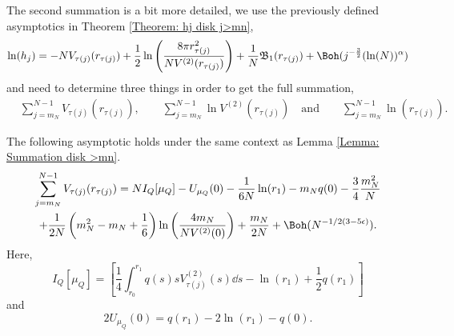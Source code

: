 The second summation is a bit more detailed, we use the previously defined asymptotics in Theorem \ref{Theorem: hj disk j>mn},
\begin{equation}
	\ln(h_j) = -N V_{\tau(j)} (r_{\tau(j)}) + \frac{1}{2} \ln{\left( \frac{8\pi r^2_{\tau(j)}}{N V^{(2)}(r_{\tau(j)})}  \right)} + \frac{1}{N} \mathfrak{B}_1(r_{\tau(j)}) + \Boh(j^{-\frac{3}{2}} (\ln(N))^\alpha)
\end{equation}
and need to determine three things in order to get the full summation,
\begin{align}
	& \sum_{j=m_N}^{N-1} V_{\tau(j)}(r_{\tau(j)}), \qquad \sum_{j=m_N}^{N-1} \ln V^{(2)}(r_{\tau(j)}) \quad \text{and} \qquad \sum_{j=m_N}^{N-1} \ln(r_{\tau(j)}).
\end{align}

\begin{proposicao}
	The following asymptotic holds under the same context as Lemma \ref{Lemma: Summation disk >mn}.
	\begin{multline}
		\sum_{j=m_N}^{N-1} V_{\tau(j)}(r_{\tau(j)}) = N I_Q[\mu_Q]  - U_{\mu_Q}(0) - \frac{1}{6N} \ln(r_1) - m_N q(0) - \frac{3}{4} \frac{m_N^2}{N} \\ + \frac{1}{2N} \left(m_N^2 - m_N + \frac{1}{6} \right) \ln{\left(\frac{4 m_N}{N V^{(2)}(0)}\right)} + \frac{m_N}{2N} + \Boh(N^{-1/2(3-5\epsilon)}).
	\end{multline}
	Here, 
	\begin{equation}
		I_Q[\mu_Q] = \left[\frac{1}{4} \int_{r_0}^{r_1} q(s) s V^{(2)}_{\tau(j)}(s) \dd s- \ln(r_1) + \frac{1}{2} q(r_1) \right]
	\end{equation}
	and
	\begin{equation}
		 2 U_{\mu_Q}(0) = q(r_1) - 2 \ln(r_1) - q(0).
	\end{equation}
\end{proposicao}


